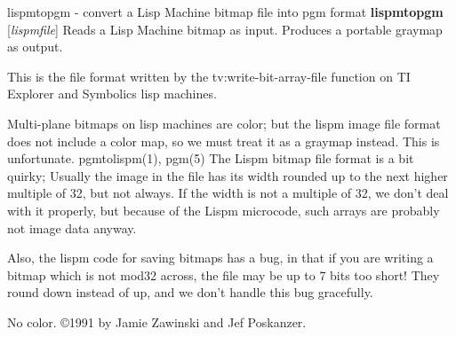 %

\newpage
%

lispmtopgm - convert a Lisp Machine bitmap file into pgm format
{\bf lispmtopgm}
{\rm [}{\it lispmfile}{\rm ]}
Reads a Lisp Machine bitmap as input.
Produces a portable graymap as output.
\par
This is the file format written by the tv:write-bit-array-file function on
TI Explorer and Symbolics lisp machines.
\par
Multi-plane bitmaps on lisp machines are color; but the lispm image file
format does not include a color map, so we must treat it as a graymap 
instead.  This is unfortunate.
pgmtolispm(1), pgm(5)
The Lispm bitmap file format is a bit quirky;  Usually the image in the file
has its width rounded up to the next higher multiple of 32, but not always.
If the width is not a multiple of 32, we don't deal with it properly, but 
because of the Lispm microcode, such arrays are probably not image data 
anyway.
\par
Also, the lispm code for saving bitmaps has a bug, in that if you are writing a
bitmap which is not mod32 across, the file may be up to 7 bits too short!  They
round down instead of up, and we don't handle this bug gracefully.
\par
No color.
\copyright 1991 by Jamie Zawinski and Jef Poskanzer.
%
 
%

